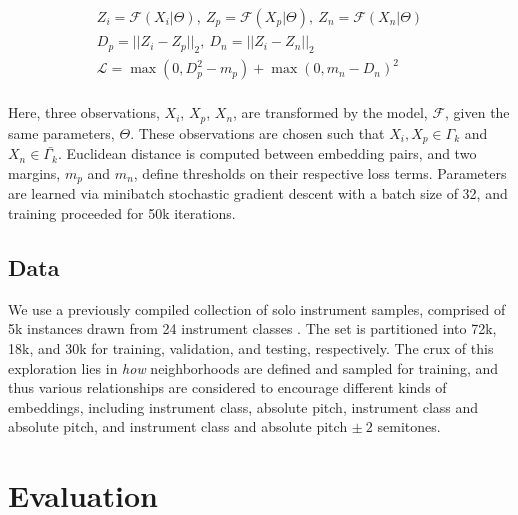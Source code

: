 \documentclass{article}
\begin{document}
\vspace{-0.15in}
\begin{align*}
Z_i = \mathcal{F}(X_i | \Theta),~Z_p = \mathcal{F}(X_p | \Theta),~Z_n = \mathcal{F}(X_n | \Theta)\\
D_p = || Z_i - Z_p ||_2,~D_n = || Z_i - Z_n ||_2\\
\mathcal{L} = \max(0, D_p^2 - m_{p}) + \max(0, m_{n} - D_n)^2 \\
\end{align*}
\vspace{-0.3in}


Here, three observations, $X_i$, $X_p$, $X_n$, are transformed by the model, $\mathcal{F}$, given the same parameters, $\Theta$.
These observations are chosen such that $X_i, X_p \in \Gamma_k$ and $X_n \in \bar{\Gamma_k}$.
Euclidean distance is computed between embedding pairs, and two margins, $m_p$ and $m_n$, define thresholds on their respective loss terms.
Parameters are learned via minibatch stochastic gradient descent with a batch size of 32, and training proceeded for 50k iterations.

\subsection{Data}

We use a previously compiled collection of solo instrument samples, comprised of 5k instances drawn from 24 instrument classes \cite{humphrey2015dl4mir}.
The set is partitioned into 72k, 18k, and 30k for training, validation, and testing, respectively.
The crux of this exploration lies in \emph{how} neighborhoods are defined and sampled for training, and thus various relationships are considered to encourage different kinds of embeddings, including instrument class, absolute pitch, instrument class and absolute pitch, and instrument class and absolute pitch $\pm~2$ semitones.


\section{Evaluation}
\end{document}
